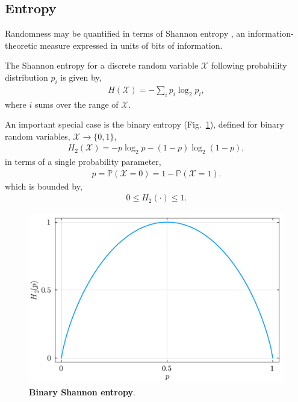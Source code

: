 \subsection{Entropy}

Randomness may be quantified in terms of Shannon entropy \cite{Shannon48}, an information-theoretic measure expressed in units of bits of information.

The Shannon entropy for a discrete random variable $\mathcal{X}$ following probability distribution $p_i$ is given by,
\begin{align}
	H(\mathcal{X}) = -\sum_i p_i \log_2 p_i,
\end{align}
where $i$ sums over the range of $\mathcal{X}$.

An important special case is the binary entropy (Fig.~\ref{fig:binary_entropy}), defined for binary random variables, \mbox{$\mathcal{X}\to\{0,1\}$},
\begin{align}
	H_2(\mathcal{X}) = -p\log_2 p - (1-p)\log_2(1-p),
\end{align}
in terms of a single probability parameter,
\begin{align}
	p = \mathbb{P}(\mathcal{X}=0) = 1-\mathbb{P}(\mathcal{X}=1).
\end{align}
which is bounded by,
\begin{align}
	0 \leq H_2(\cdot) \leq 1.
\end{align}

\begin{figure}[!htp]
	\includegraphics[width=\columnwidth]{figs/binary_entropy.pdf}
	\caption{\textbf{Binary Shannon entropy}.} \label{fig:binary_entropy}
\end{figure}

